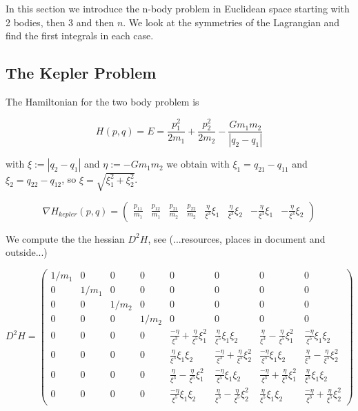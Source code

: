 \documentclass[12pt]{article}
\begin{document}
In this section we introduce the n-body problem in Euclidean space starting with 2 bodies, then 3 and then $n$. We look at the symmetries of the Lagrangian and find the first integrals in each case. 

\subsection{The Kepler Problem}

The Hamiltonian for the two body problem is

\begin{equation}\label{eq:hamiltonian kepler}
    H(p,q) = E = \frac{p_1^2}{2m_1} + \frac{p_2^2}{2m_2} - \frac{G m_1m_2}{|q_2-q_1|}
\end{equation}

with $\xi := |q_2-q_1|$ and $\eta := -Gm_1m_2$ we obtain with $\xi_1 = q_{21} - q_{11}$ and $\xi_2 = q_{22} - q_{12}$, so $\xi = \sqrt{\xi_1^2 + \xi_2^2}$. 

\begin{equation}\label{eq:nabla hamiltonian kepler}
    \nabla H_{kepler}(p,q) = \begin{pmatrix} 
    \frac{p_{11}}{m_1} & \frac{p_{12}}{m_1} & \frac{p_{21}}{m_2} & \frac{p_{22}}{m_2} & 
    \frac\eta{\xi^3} \xi_1 & \frac\eta{\xi^3} \xi_2 & -\frac\eta{\xi^3} \xi_1 & -\frac\eta{\xi^3} \xi_2 
    \end{pmatrix}
\end{equation}

We compute the the hessian $D^2 H$, see (...resources, places in document and outside...)

\begin{equation}\label{eq:hessian of hamiltonian kepler}
    D^2 H =
    \left(\begin{array}{cccc|cccc}
    1/m_1 & 0 & 0 & 0    &    0 & 0 & 0 & 0\\
    0 & 1/m_1 & 0 & 0    &    0 & 0 & 0 & 0\\
    0 & 0 & 1/m_2 & 0    &    0 & 0 & 0 & 0\\
    0 & 0 & 0 & 1/m_2    &    0 & 0 & 0 & 0\\
    \hline 
    0 & 0 & 0 & 0        &    \frac{-\eta}{\xi^3} + \frac{\eta}{\xi^5}\xi_1^2 & \frac{\eta}{\xi^5}\xi_1\xi_2 & \frac{\eta}{\xi^3} - \frac{\eta}{\xi^5}\xi_1^2 & \frac{-\eta}{\xi^5}\xi_1\xi_2 \\
    0 & 0 & 0 & 0        &    \frac{\eta}{\xi^5}\xi_1\xi_2 & \frac{-\eta}{\xi^3} + \frac{\eta}{\xi^5}\xi_2^2 & \frac{-\eta}{\xi^5}\xi_1\xi_2 & \frac{\eta}{\xi^3} - \frac{\eta}{\xi^5}\xi_2^2 \\
    0 & 0 & 0 & 0        &    \frac{\eta}{\xi^3} - \frac{\eta}{\xi^5}\xi_1^2 & \frac{-\eta}{\xi^5}\xi_1\xi_2 & \frac{-\eta}{\xi^3} + \frac{\eta}{\xi^5}\xi_1^2 & \frac{\eta}{\xi^5}\xi_1\xi_2 \\
    0 & 0 & 0 & 0        &    \frac{-\eta}{\xi^5}\xi_1\xi_2 & \frac{\eta}{\xi^3} - \frac{\eta}{\xi^5}\xi_2^2 & \frac{\eta}{\xi^5}\xi_1\xi_2 & \frac{-\eta}{\xi^3} + \frac{\eta}{\xi^5}\xi_2^2
    \end{array}\right)
\end{equation}
\end{document}
